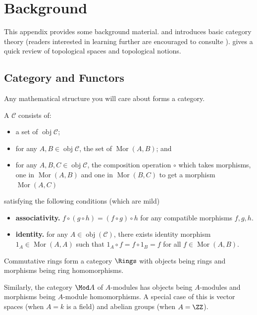 \chapter{Background}
\label{chap:background}
This appendix provides some background material.
 and  
introduces basic category theory
(readers interested in learning further are encouraged
to consulte \cite{category}).
 gives a quick review 
of topological spaces and topological notions.

\section{Category and Functors}
\label{sec:category}
Any mathematical structure you will care about
forms a category.
\begin{definition}
    A  $\mathcal C$ consists of:
    \begin{itemize}
    \item a set of 
    $\operatorname{obj} \mathcal C$;
    \item  for any
    $A,B\in\operatorname{obj} \mathcal C$,
    the set of  $\operatorname{Mor}(A,B)$; and
    \item for any $A,B,C\in\operatorname{obj} \mathcal C$,
    the composition operation $\circ$
    which takes morphisms, one in $\operatorname{Mor}(A,B)$
    and one in $\operatorname{Mor}(B,C)$
    to get a morphism $\operatorname{Mor}(A,C)$
    \end{itemize}
    satisfying the following conditions 
    (which are mild)
    \begin{itemize}
    \item \textbf{associativity.} 
    $f\circ(g\circ h) = (f\circ g)\circ h$
    for any compatible morphisms $f,g,h$.
    \item \textbf{identity.}
    for any $A\in \operatorname{obj}(\mathcal C)$,
    there exists identity morphism $1_A \in 
    \operatorname{Mor}(A,A)$ such that 
    $1_A\circ f = f\circ 1_B = f$
    for all $f\in \operatorname{Mor}(A,B)$.
    \end{itemize}
\end{definition}
\begin{example}
Commutative rings form a category
$\Rings$ with objects being rings 
and morphisms being ring homomorphisms.

Similarly, the category $\Mod A$ of $A$-modules
has objects being $A$-modules and morphisms being 
$A$-module homomorphisms.
A special case of this is vector spaces (when $A=k$ is a field)
and abelian groups (when $A=\ZZ$).
\end{example}
